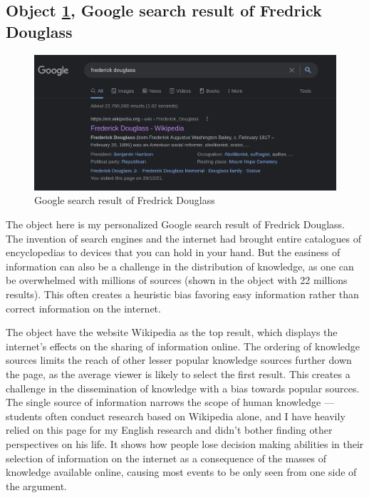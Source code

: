 \documentclass[a4paper,11pt]{article}
\begin{document}


\subsection*{Object \ref{fig:download}, Google search result of Fredrick Douglass}

\begin{figure}[H]
 \centering
 \includegraphics[scale=0.25]{douglass.png}
 \caption{Google search result of Fredrick Douglass}
 \label{fig:download}
\end{figure}

The object here is my personalized Google search result of Fredrick Douglass. The invention of search engines and the internet had brought entire catalogues of encyclopedias to devices that you can hold in your hand. But the easiness of information can also be a challenge in the distribution of knowledge, as one can be overwhelmed with millions of sources (shown in the object with 22 millions results). This often creates a heuristic bias favoring easy information rather than correct information on the internet.

The object have the website Wikipedia as the top result, which displays the internet's effects on the sharing of information online. The ordering of knowledge sources limits the reach of other lesser popular knowledge sources further down the page, as the average viewer is likely to select the first result. This creates a challenge in the dissemination of knowledge with a bias towards popular sources. The single source of information narrows the scope of human knowledge --- students often conduct research based on Wikipedia alone, and I have heavily relied on this page for my English research and didn't bother finding other perspectives on his life. It shows how people lose decision making abilities in their selection of information on the internet as a consequence of the masses of knowledge available online, causing most events to be only seen from one side of the argument.
\end{document}
